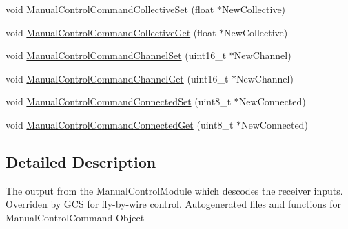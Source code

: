 \begin{DoxyCompactItemize}
\item 
void \hyperlink{group___manual_control_command_ga218dfc48d559b5f5cadf4320c989e6f1}{\-Manual\-Control\-Command\-Collective\-Set} (float $\ast$\-New\-Collective)
\item 
void \hyperlink{group___manual_control_command_ga199fa0ed6fd21162c1334b81ea7552fd}{\-Manual\-Control\-Command\-Collective\-Get} (float $\ast$\-New\-Collective)
\item 
void \hyperlink{group___manual_control_command_gaf19267a0864860cecdf619a533016c3b}{\-Manual\-Control\-Command\-Channel\-Set} (uint16\-\_\-t $\ast$\-New\-Channel)
\item 
void \hyperlink{group___manual_control_command_ga0b9d61ee624ac06ea328d68b2e83bf4e}{\-Manual\-Control\-Command\-Channel\-Get} (uint16\-\_\-t $\ast$\-New\-Channel)
\item 
void \hyperlink{group___manual_control_command_ga61015ae4ba642789e9b6fc10d3868911}{\-Manual\-Control\-Command\-Connected\-Set} (uint8\-\_\-t $\ast$\-New\-Connected)
\item 
void \hyperlink{group___manual_control_command_ga9e5c8e2e046d762fecf30f340a2a7346}{\-Manual\-Control\-Command\-Connected\-Get} (uint8\-\_\-t $\ast$\-New\-Connected)
\end{DoxyCompactItemize}


\subsection{\-Detailed \-Description}
\-The output from the \-Manual\-Control\-Module which descodes the receiver inputs. \-Overriden by \-G\-C\-S for fly-\/by-\/wire control. \-Autogenerated files and functions for \-Manual\-Control\-Command \-Object 

